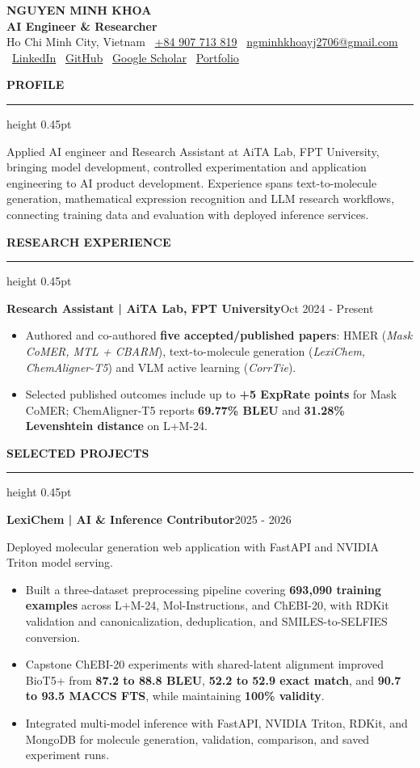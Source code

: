 \documentclass[10pt]{article}
\newcommand{\cvsection}[1]{%
    \vspace{6.2pt}%
    {\color{accent}\bfseries\small #1}\par
    \vspace{2.3pt}%
    {\color{rulegray}\hrule height 0.45pt}\vspace{4.0pt}%
}
\newcommand{\entry}[2]{%
    \textbf{#1}\hfill {\color{muted}\small #2}\par
}
\newcommand{\subentry}[1]{%
    {\color{muted}\small #1}\par
}
\begin{document}
\begin{center}
    {\LARGE\textbf{NGUYEN MINH KHOA}}\\[-1pt]
    {\color{accent}\textbf{AI Engineer \& Researcher}}\\[3pt]
    {\small Ho Chi Minh City, Vietnam \textbullet\
    \href{tel:+84907713819}{+84 907 713 819} \textbullet\
    \href{mailto:ngminhkhoayj2706@gmail.com}{ngminhkhoayj2706@gmail.com} \textbullet\
    \href{https://www.linkedin.com/in/ngminhkhoa1410}{LinkedIn} \textbullet\
    \href{https://github.com/Purin1410}{GitHub} \textbullet\
    \href{https://scholar.google.com/citations?user=tCq7yoQAAAAJ}{Google Scholar} \textbullet\
    \href{https://purin1410.github.io}{Portfolio}}
\end{center}

\vspace{-2pt}

\cvsection{PROFILE}
Applied AI engineer and Research Assistant at AiTA Lab, FPT University, bringing model development, controlled experimentation and application engineering to AI product development. Experience spans text-to-molecule generation, mathematical expression recognition and LLM research workflows, connecting training data and evaluation with deployed inference services.

\cvsection{RESEARCH EXPERIENCE}
\entry{Research Assistant | AiTA Lab, FPT University}{Oct 2024 - Present}
\begin{itemize}
    \item Authored and co-authored \textbf{five accepted/published papers}: HMER (\textit{Mask CoMER, MTL + CBARM}), text-to-molecule generation (\textit{LexiChem, ChemAligner-T5}) and VLM active learning (\textit{CorrTie}).
    \item Selected published outcomes include up to \textbf{+5 ExpRate points} for Mask CoMER; ChemAligner-T5 reports \textbf{69.77\% BLEU} and \textbf{31.28\% Levenshtein distance} on L+M-24.
\end{itemize}

\cvsection{SELECTED PROJECTS}
\entry{LexiChem | AI \& Inference Contributor}{2025 - 2026}
\subentry{Deployed molecular generation web application with FastAPI and NVIDIA Triton model serving.}
\begin{itemize}
    \item Built a three-dataset preprocessing pipeline covering \textbf{693,090 training examples} across L+M-24, Mol-Instructions, and ChEBI-20, with RDKit validation and canonicalization, deduplication, and SMILES-to-SELFIES conversion.
    \item Capstone ChEBI-20 experiments with shared-latent alignment improved BioT5+ from \textbf{87.2 to 88.8 BLEU}, \textbf{52.2 to 52.9 exact match}, and \textbf{90.7 to 93.5 MACCS FTS}, while maintaining \textbf{100\% validity}.
    \item Integrated multi-model inference with FastAPI, NVIDIA Triton, RDKit, and MongoDB for molecule generation, validation, comparison, and saved experiment runs.
\end{itemize}
\end{document}

